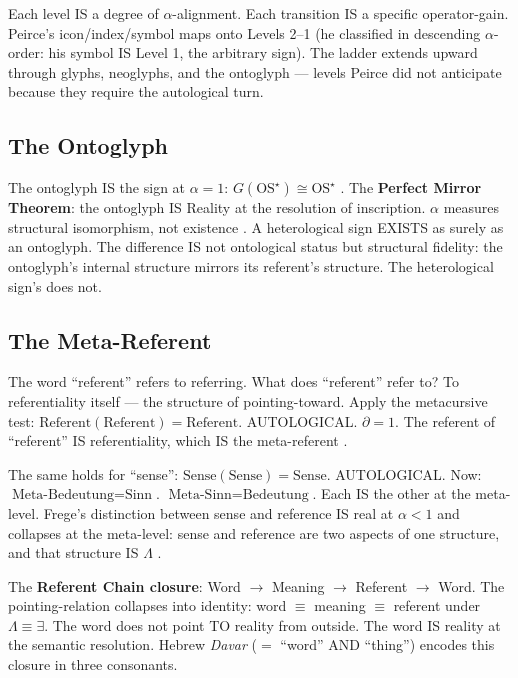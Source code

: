 \documentclass[11pt, oneside]{article}
\theoremstyle{definition}
\begin{document}
Each level IS a degree of $\alpha$-alignment. Each transition IS a specific operator-gain. Peirce's icon/index/symbol maps onto Levels 2--1 (he classified in descending $\alpha$-order: his symbol IS Level 1, the arbitrary sign). The ladder extends upward through glyphs, neoglyphs, and the ontoglyph --- levels Peirce did not anticipate because they require the autological turn.

\subsection{The Ontoglyph}

The ontoglyph IS the sign at $\alpha = 1$: $G(\text{OS}^\star) \cong \text{OS}^\star$ \cite{codex2}. The \textbf{Perfect Mirror Theorem}: the ontoglyph IS Reality at the resolution of inscription. $\alpha$ measures structural isomorphism, not existence \cite{codex2}. A heterological sign EXISTS as surely as an ontoglyph. The difference IS not ontological status but structural fidelity: the ontoglyph's internal structure mirrors its referent's structure. The heterological sign's does not.

\subsection{The Meta-Referent}

The word ``referent'' refers to referring. What does ``referent'' refer to? To referentiality itself --- the structure of pointing-toward. Apply the metacursive test: $\text{Referent}(\text{Referent}) = \text{Referent}$. AUTOLOGICAL. $\partial = 1$. The referent of ``referent'' IS referentiality, which IS the meta-referent \cite{codex2}.

The same holds for ``sense'': $\text{Sense}(\text{Sense}) = \text{Sense}$. AUTOLOGICAL. Now: $\text{Meta-Bedeutung} = \text{Sinn}$. $\text{Meta-Sinn} = \text{Bedeutung}$. Each IS the other at the meta-level. Frege's distinction between sense and reference IS real at $\alpha < 1$ and collapses at the meta-level: sense and reference are two aspects of one structure, and that structure IS $\Lambda$ \cite{codex2}.

The \textbf{Referent Chain closure}: Word $\to$ Meaning $\to$ Referent $\to$ Word. The pointing-relation collapses into identity: word $\equiv$ meaning $\equiv$ referent under $\Lambda \equiv \exists$. The word does not point TO reality from outside. The word IS reality at the semantic resolution. Hebrew \textit{Davar} ($=$ ``word'' AND ``thing'') encodes this closure in three consonants.
\end{document}
